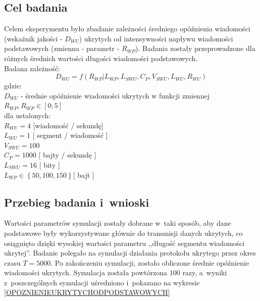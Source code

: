 \documentclass[a4paper, twoside, openright, 12pt]{report}
\begin{document}
        \subsection{Cel badania}
            Celem eksperymentu było zbadanie zależności średniego opóźnienia wiadomości (wskaźnik jakości - \( D_{WU} \))
            ukrytych od intensywności napływu wiadomości podstawowych (zmienna - parametr - \(R_{WP}\)).
            Badania zostały przeprowadzone dla różnych średnich wartości długości wiadomości
            podstawowych. \\
            Badana zależność: \\
                $$ D_{WU} = f(R_{WP} | L_{WP}, L_{SWU}, C_P, V_{SWU}, L_{WU}, R_{WU}) $$
            gdzie:\\
                \( D_{WU} \) - średnie opóźnienie wiadomości ukrytych w funkcji zmiennej \( R_{WP}, R_{WP} \in [0;5]\) \\
                dla ustalonych: \\
                \( R_{WU}  = 4 \) [wiadomość / sekundę]  \\
                \( L_{WU}  = 1 \) [ segment / wiadomość ]\\
                \( V_{SWU}  = 100 \)\\
                \( C_P  = 1000 \) [ bajty / sekundę ]\\
                \( L_{SWU}  = 16 \) [ bity ]\\
                \( L_{WP}  \in \left\{50, 100, 150\right\} \)[ bajt ] \\
        \subsection{Przebieg badania i~wnioski}
            Wartości parametrów symulacji zostały dobrane w~taki sposób, aby dane podstawowe
            były wykorzystywane głównie do transmisji danych ukrytych, co osiągnięto
            dzięki wysokiej wartości parametru ,,długość segmentu wiadomości ukrytej''.
            Badanie polegało na symulacji działania protokołu ukrytego przez okres czasu
            \( T = 5000 \). Po zakończeniu symulacji, zostało obliczone
            średnie opóźnienie wiadomości ukrytych.
            Symulacja została powtórzona \( 100 \) razy, a~wyniki z~poszczególnych
            symulacji uśredniono i~pokazano na wykresie \ref{OPOZNIENIEUKRYTYCHODPODSTAWOWYCH}
\end{document}
